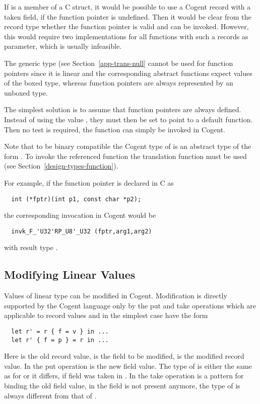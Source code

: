 If  is a member of a C struct, it would be possible to use a Cogent record with a taken field,
if the function pointer is undefined. Then it would be clear from the record type whether the function pointer
is valid and can be invoked. However, this would require two implementations for all functions with such a records 
as parameter, which is usually infeasible.

The generic type  (see Section~\ref{app-trans-null} cannot be used for function pointers since
it is linear and the corresponding abstract functions expect values of the boxed type, whereas function pointers
are always represented by an unboxed type.

The simplest solution is to assume that function pointers are always defined. Instead of using the value 
, they must then be set to point to a default function. Then no test is required, the function
can simply be invoked in Cogent.

Note that to be binary compatible the Cogent type of  is an abstract type of the form .
To invoke the referenced function the translation function  must be used (see 
Section~\ref{design-types-function}). 

For example, if the function pointer is declared in C as 
\begin{verbatim}
  int (*fptr)(int p1, const char *p2);
\end{verbatim}
the corresponding invocation in Cogent would be
\begin{verbatim}
  invk_F_'U32'RP_U8'_U32 (fptr,arg1,arg2)
\end{verbatim}
with result type .

\subsection{Modifying Linear Values}
\label{app-trans-modify}

Values of linear type can be modified in Cogent. Modification is directly supported by the Cogent language only by the put
and take operations which are applicable to record values and in the simplest case have the form
\begin{verbatim}
  let r' = r { f = v } in ...
  let r' { f = p } = r in ...
\end{verbatim}
Here  is the old record value,  is the field to be modified,  is the modified record value.
In the put operation  is the new field value. The type of  is either the same as for  or it
differs, if field  was taken in . In the take operation  is a pattern for binding the old 
field value, in  the field is not present anymore, the type of  is always different from that of .

